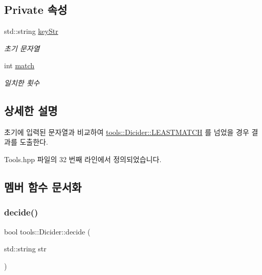 \subsection*{Private 속성}
\begin{DoxyCompactItemize}
\item 
\mbox{\label{classtools_1_1_dicider_ad5934d4a2abed460c22ea2b6313bdb5f}} 
std\+::string \hyperlink{classtools_1_1_dicider_ad5934d4a2abed460c22ea2b6313bdb5f}{key\+Str}
\begin{DoxyCompactList}\small\item\em 초기 문자열 \end{DoxyCompactList}\item 
\mbox{\label{classtools_1_1_dicider_acb9cec03e38fc8609c48f1acc5fb934d}} 
int \hyperlink{classtools_1_1_dicider_acb9cec03e38fc8609c48f1acc5fb934d}{match}
\begin{DoxyCompactList}\small\item\em 일치한 횟수 \end{DoxyCompactList}\end{DoxyCompactItemize}


\subsection{상세한 설명}
초기에 입력된 문자열과 비교하여 \hyperlink{classtools_1_1_dicider_afdc1fb561a2ed8037d0fa87b69a7792d}{tools\+::\+Dicider\+::\+L\+E\+A\+S\+T\+M\+A\+T\+CH} 를 넘었을 경우 결과를 도출한다. 

Tools.\+hpp 파일의 32 번째 라인에서 정의되었습니다.



\subsection{멤버 함수 문서화}
\mbox{\label{classtools_1_1_dicider_a7340ce8845ca163e4bcddd73be54a0c9}} 
\subsubsection{\texorpdfstring{decide()}{decide()}}
{\footnotesize\ttfamily bool tools\+::\+Dicider\+::decide (\begin{DoxyParamCaption}\item[{std\+::string}]{str }\end{DoxyParamCaption})}



